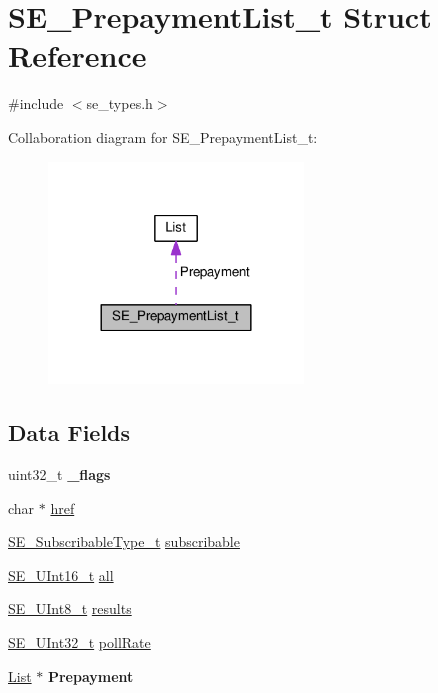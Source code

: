 \hypertarget{structSE__PrepaymentList__t}{}\section{S\+E\+\_\+\+Prepayment\+List\+\_\+t Struct Reference}
\label{structSE__PrepaymentList__t}


{\ttfamily \#include $<$se\+\_\+types.\+h$>$}



Collaboration diagram for S\+E\+\_\+\+Prepayment\+List\+\_\+t\+:\nopagebreak
\begin{figure}[H]
\begin{center}
\leavevmode
\includegraphics[width=192pt]{structSE__PrepaymentList__t__coll__graph}
\end{center}
\end{figure}
\subsection*{Data Fields}
\begin{DoxyCompactItemize}
\item 
uint32\+\_\+t {\bfseries \+\_\+flags}
\item 
char $\ast$ \hyperlink{group__PrepaymentList_gade40515dbf8f0153a026bc727070c5d6}{href}
\item 
\hyperlink{group__SubscribableType_ga5c41f553d369710ed34619266bf2551e}{S\+E\+\_\+\+Subscribable\+Type\+\_\+t} \hyperlink{group__PrepaymentList_ga164852891c027b156fae9dcb1228637d}{subscribable}
\item 
\hyperlink{group__UInt16_gac68d541f189538bfd30cfaa712d20d29}{S\+E\+\_\+\+U\+Int16\+\_\+t} \hyperlink{group__PrepaymentList_gabdbbcf75a3461d82f5322ddb66762a3c}{all}
\item 
\hyperlink{group__UInt8_gaf7c365a1acfe204e3a67c16ed44572f5}{S\+E\+\_\+\+U\+Int8\+\_\+t} \hyperlink{group__PrepaymentList_gae1c498eedbfe6cd548de3255354cb516}{results}
\item 
\hyperlink{group__UInt32_ga70bd4ecda3c0c85d20779d685a270cdb}{S\+E\+\_\+\+U\+Int32\+\_\+t} \hyperlink{group__PrepaymentList_gac66cf2fbf74ea3446a4efe5d6fdf47c9}{poll\+Rate}
\item 
\hyperlink{structList}{List} $\ast$ {\bfseries Prepayment}
\end{DoxyCompactItemize}


